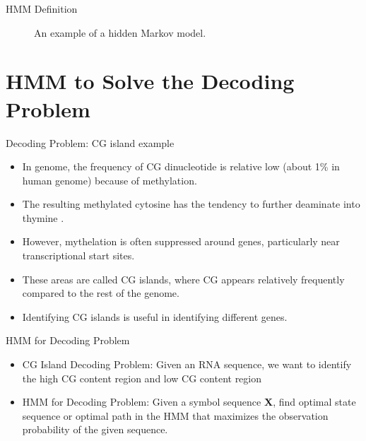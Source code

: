 \documentclass{beamer}
\begin{document}
\begin{frame}{HMM Definition}
	\begin{figure}
		\centering
		\caption{An example of a hidden Markov model.}
		\label{fig:HiddenMarkov}
	\end{figure}
\end{frame}
\section{HMM to Solve the Decoding Problem}
\begin{frame}{Decoding Problem: CG island example}
	\begin{itemize}
		\item In genome, the frequency of CG dinucleotide is relative low (about 1\% in human genome) because of methylation. 
		\item The resulting methylated cytosine has the tendency to further deaminate into thymine \cite{compeau2018bioinformatics}.
		\item However, mythelation is often suppressed around genes, particularly near transcriptional start sites.
		\item These areas are called CG islands, where CG appears relatively frequently compared to the rest of the genome.
		\item Identifying CG islands is useful in identifying different genes.
	\end{itemize}
\end{frame}

\begin{frame}{HMM for Decoding Problem}
	\begin{itemize}
		\item CG Island Decoding Problem: Given an RNA sequence, we want to identify the high CG content region and low CG content region
		\item HMM for Decoding Problem: Given a symbol sequence \textbf{X}, find optimal state sequence or optimal path in the HMM that maximizes the observation probability of the given sequence.
	\end{itemize}
\end{frame}
\end{document}
